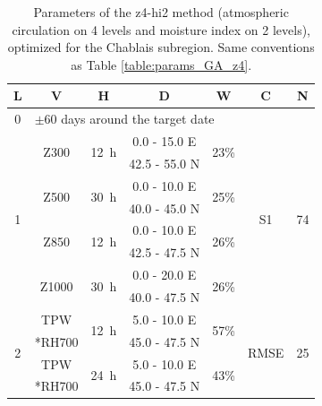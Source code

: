 \documentclass[5p]{elsarticle}
\begin{document}
\begin{table}[htbp]
	\caption{Parameters of the z4-hi2 method (atmospheric circulation on 4 levels and moisture index on 2 levels), optimized for the Chablais subregion. Same conventions as Table \ref{table:params_GA_z4}.}
	\footnotesize
	\begin{center}
		\begin{tabular}{ccccccc}
			\hline L & V & H & D & W & C & N \\ 
			\hline 
			0 & \multicolumn{6}{l}{$\pm 60$ days around the target date} \\
			\hline 
			\multirow{8}{*}{1} &  \multirow{2}{*}{Z300} & \multirow{2}{*}{12~h} & 0.0 - 15.0 \degree E & \multirow{2}{*}{23\%} & \multirow{8}{*}{S1} & \multirow{8}{*}{74} \\
			& & & 42.5 - 55.0 \degree N & & & \\ 
			& \multirow{2}{*}{Z500} & \multirow{2}{*}{30~h} & 0.0 - 10.0 \degree E & \multirow{2}{*}{25\%} & & \\ 
			& & & 40.0 - 45.0 \degree N & & & \\ 
			& \multirow{2}{*}{Z850} & \multirow{2}{*}{12~h} & 0.0 - 10.0 \degree E & \multirow{2}{*}{26\%} & & \\ 
			& & & 42.5 - 47.5 \degree N & & & \\ 
			& \multirow{2}{*}{Z1000} & \multirow{2}{*}{30~h} & 0.0 - 20.0 \degree E & \multirow{2}{*}{26\%} & & \\ 
			& & & 40.0 - 47.5 \degree N & & & \\ 
			\hline 
			\multirow{4}{*}{2} & TPW & \multirow{2}{*}{12~h} & 5.0 - 10.0 \degree E & \multirow{2}{*}{57\%} & \multirow{4}{*}{RMSE} & \multirow{4}{*}{25} \\
			& *RH700 & & 45.0 - 47.5 \degree N & & & \\ 
			& TPW & \multirow{2}{*}{24~h} & 5.0 - 10.0 \degree E & \multirow{2}{*}{43\%} & & \\ 
			& *RH700 & & 45.0 - 47.5 \degree N & & & \\ 
			\hline 
		\end{tabular} 
	\end{center}
	\label{table:params_GA_z4_hi2}
\end{table}
\end{document}
